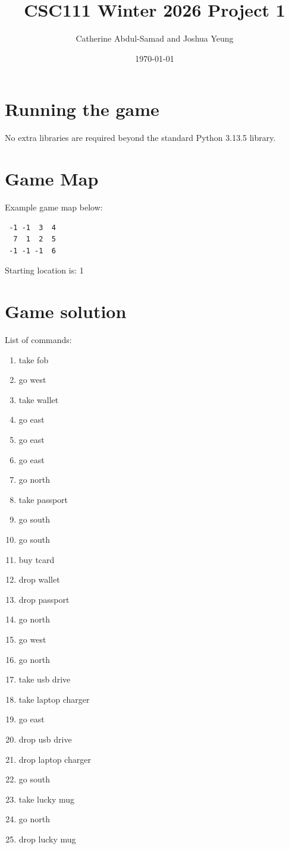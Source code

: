 \documentclass[11pt]{article}
\title{CSC111 Winter 2026 Project 1}
\author{Catherine Abdul-Samad and Joshua Yeung}
\date{\today}
\begin{document}
\maketitle

\section*{Running the game}
No extra libraries are required beyond the standard Python 3.13.5 library.

\section*{Game Map}
Example game map below:

\begin{verbatim}
 -1 -1  3  4
  7  1  2  5
 -1 -1 -1  6
\end{verbatim}

Starting location is: 1

\section*{Game solution}
List of commands:
\begin{enumerate}
    \item take fob
    \item go west
    \item take wallet
    \item go east
    \item go east
    \item go east
    \item go north
    \item take passport
    \item go south
    \item go south
    \item buy tcard
    \item drop wallet
    \item drop passport
    \item go north
    \item go west
    \item go north
    \item take usb drive
    \item take laptop charger
    \item go east
    \item drop usb drive
    \item drop laptop charger
    \item go south
    \item take lucky mug
    \item go north
    \item drop lucky mug
\end{enumerate}
\end{document}
